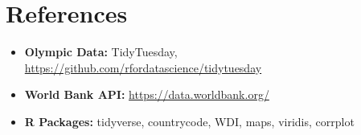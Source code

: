 \documentclass[11pt]{article}
\begin{document}
\section{References}
\begin{itemize}
  \item \textbf{Olympic Data:} TidyTuesday, \url{https://github.com/rfordatascience/tidytuesday}  
  \item \textbf{World Bank API:} \url{https://data.worldbank.org/}  
  \item \textbf{R Packages:} tidyverse, countrycode, WDI, maps, viridis, corrplot  
\end{itemize}
\end{document}
